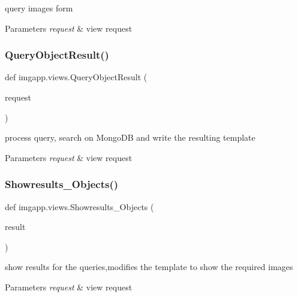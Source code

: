query images form 


\begin{DoxyParams}{Parameters}
{\em request} & view request \\
\hline
\end{DoxyParams}
\mbox{\label{namespaceimgapp_1_1views_a06d5c0cac6ae36a355b522abb883932b}} 
\subsubsection{\texorpdfstring{Query\+Object\+Result()}{QueryObjectResult()}}
{\footnotesize\ttfamily def imgapp.\+views.\+Query\+Object\+Result (\begin{DoxyParamCaption}\item[{}]{request }\end{DoxyParamCaption})}



process query, search on Mongo\+DB and write the resulting template 


\begin{DoxyParams}{Parameters}
{\em request} & view request \\
\hline
\end{DoxyParams}
\mbox{\label{namespaceimgapp_1_1views_a6ce45040afbe69d047853cb4258a4761}} 
\subsubsection{\texorpdfstring{Showresults\+\_\+\+Objects()}{Showresults\_Objects()}}
{\footnotesize\ttfamily def imgapp.\+views.\+Showresults\+\_\+\+Objects (\begin{DoxyParamCaption}\item[{}]{result }\end{DoxyParamCaption})}



show results for the queries,modifies the template to show the required images 


\begin{DoxyParams}{Parameters}
{\em request} & view request \\
\hline
\end{DoxyParams}
\mbox{\label{namespaceimgapp_1_1views_a7ff46cd0d8d9cddbd78a488b2e45ce0c}} 
